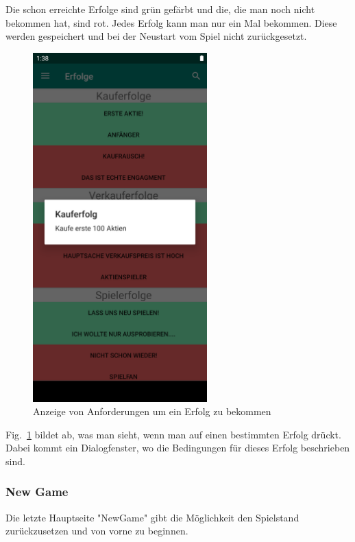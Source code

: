 \documentclass[10pt]{scrartcl}
\begin{document}
Die schon erreichte Erfolge sind grün gefärbt und die, die man noch nicht bekommen hat, sind rot. Jedes Erfolg kann man nur ein Mal bekommen. Diese werden gespeichert und bei der Neustart vom Spiel nicht zurückgesetzt.

\begin{figure}[H]
	\centering
	\includegraphics[width=0.6\textwidth]{Bilder/Applikation/erfolgeDetalien.png}
	\caption{Anzeige von Anforderungen um ein Erfolg zu bekommen}
	\label{erfolge2}
\end{figure}

Fig.~\ref{erfolge2} bildet ab, was man sieht, wenn man auf einen bestimmten Erfolg drückt. Dabei kommt ein Dialogfenster, wo die Bedingungen für dieses Erfolg beschrieben sind.

\subsubsection{New Game}

Die letzte Hauptseite "NewGame" gibt die Möglichkeit den Spielstand zurückzusetzen und von vorne zu beginnen. 
\end{document}
